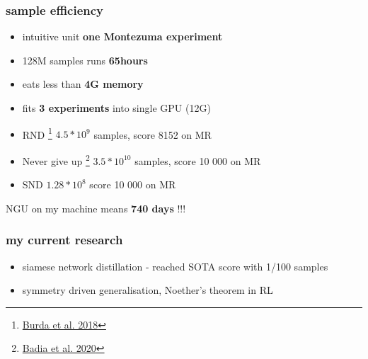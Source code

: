 \documentclass{beamer}
\begin{document}
\begin{frame}
  
  \frametitle{sample efficiency}

  \begin{itemize}
    \item intuitive unit {\bf one Montezuma experiment}
    \item 128M samples runs {\bf 65hours}
    \item eats less than {\bf 4G memory}
    \item fits {\bf 3 experiments} into single GPU (12G)
  \end{itemize}

  \bigskip

  \begin{itemize}
    \item RND \footnote{\href{https://arxiv.org/pdf/1810.12894.pdf}{Burda et al. 2018}} $4.5*10^9$ samples, score 8152 on MR
    \item Never give up \footnote{\href{https://arxiv.org/pdf/2002.06038.pdf}{Badia et al. 2020}} $3.5*10^{10}$ samples, score 10 000 on MR
    \item SND $1.28*10^8$ score 10 000 on MR 
  \end{itemize}

  NGU on my machine means {\bf 740 days} !!!
\end{frame}


\begin{frame}
  
  \frametitle{my current research}

    \begin{itemize}
      \item siamese network distillation - reached SOTA score with 1/100 samples
      \item symmetry driven generalisation, Noether's theorem in RL
    \end{itemize}

    
\end{frame}
\end{document}
